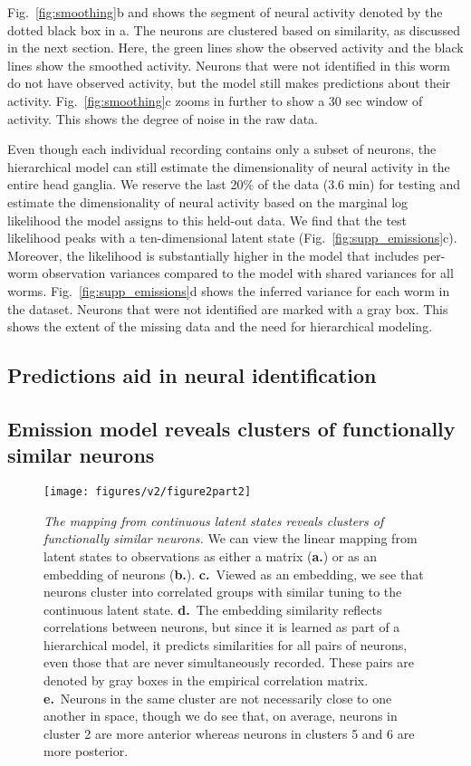 \documentclass[11pt]{article}
\begin{document}
Fig.~\ref{fig:smoothing}b and shows the segment of neural activity
denoted by the dotted black box in a. The neurons are clustered based
on similarity, as discussed in the next section.  Here, the green lines
show the observed activity and the black lines show the smoothed activity.
Neurons that were not identified in this worm do not have observed activity,
but the model still makes predictions about their activity. Fig.~\ref{fig:smoothing}c
zooms in further to show a 30 sec window of activity. This shows the
degree of noise in the raw data. 

Even though each individual recording contains only a subset of neurons,
the hierarchical model can still estimate the dimensionality of
neural activity in the entire head ganglia.  We reserve the last 20\% of
the data (3.6 min) for testing and estimate the dimensionality
of neural activity based on the marginal log likelihood the model assigns
to this held-out data. We find that the test likelihood peaks with a
ten-dimensional latent state (Fig.~\ref{fig:supp_emissions}c).  Moreover, the likelihood is substantially
higher in the model that includes per-worm observation variances
compared to the model with shared variances for all worms. Fig.~\ref{fig:supp_emissions}d
shows the inferred variance for each worm in the \citet{kato2015global}
dataset.  Neurons that were not identified are marked with a gray box.
This shows the extent of the missing data and the need for hierarchical
modeling.

\subsection*{Predictions aid in neural identification}


\subsection*{Emission model reveals clusters of functionally similar neurons}

\begin{figure}[t!]
\centering
\texttt{[image: figures/v2/figure2part2]} 
\caption{ \textit{The mapping from continuous latent states reveals clusters of
    functionally similar neurons.}
  We can view the linear mapping from latent states to observations
  as either a matrix (\textbf{a.}) or as an embedding of neurons (\textbf{b.}).
  \textbf{c.}~Viewed as an embedding, we see that neurons cluster into
  correlated groups with similar tuning to the continuous latent state.
  \textbf{d.}~The embedding similarity reflects correlations between
  neurons, but since it is learned as part of a hierarchical model, it
  predicts similarities for all pairs of neurons, even those that are
  never simultaneously recorded.  These pairs are denoted by gray boxes
  in the empirical correlation matrix.
  \textbf{e.}~Neurons in the same cluster are not necessarily close
  to one another in space, though we do see that, on average, neurons in cluster 2
  are more anterior whereas neurons in clusters 5 and 6 are more posterior.}
\label{fig:clustering}
\end{figure}
\end{document}
